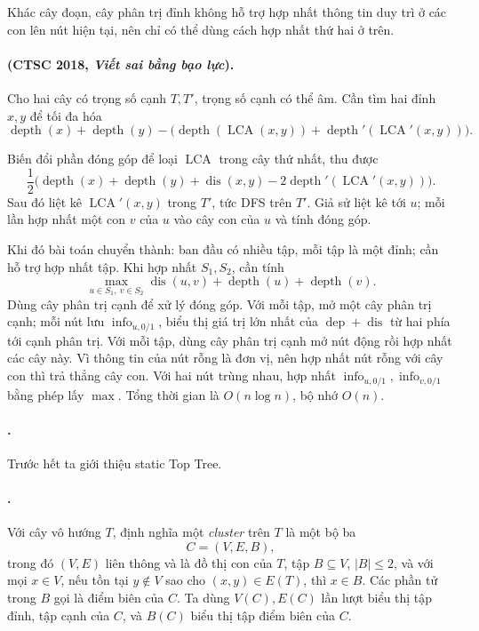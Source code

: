 \documentclass[11pt]{article}
\begin{document}
Khác cây đoạn, cây phân trị đỉnh không hỗ trợ hợp nhất thông tin duy trì ở các
con lên nút hiện tại, nên chỉ có thể dùng cách hợp nhất thứ hai ở trên.

\paragraph{ (CTSC 2018, \emph{Viết sai bằng bạo lực}).}
Cho hai cây có trọng số cạnh \(T,T'\), trọng số cạnh có thể âm. Cần tìm hai
đỉnh \(x,y\) để tối đa hóa
\[
  \operatorname{depth}(x)+\operatorname{depth}(y)
  -\bigl(\operatorname{depth}(\operatorname{LCA}(x,y))
  +\operatorname{depth}'(\operatorname{LCA}'(x,y))\bigr).
\]

Biến đổi phần đóng góp để loại \(\operatorname{LCA}\) trong cây thứ nhất, thu
được
\[
\frac12\bigl(
  \operatorname{depth}(x)+\operatorname{depth}(y)+\operatorname{dis}(x,y)
  -2\operatorname{depth}'(\operatorname{LCA}'(x,y))\bigr).
\]
Sau đó liệt kê \(\operatorname{LCA}'(x,y)\) trong \(T'\), tức DFS trên \(T'\).
Giả sử liệt kê tới \(u\); mỗi lần hợp nhất một con \(v\) của \(u\) vào cây con
của \(u\) và tính đóng góp.

Khi đó bài toán chuyển thành: ban đầu có nhiều tập, mỗi tập là một đỉnh; cần hỗ
trợ hợp nhất tập. Khi hợp nhất \(S_1,S_2\), cần tính
\[
  \max_{u\in S_1,\ v\in S_2}
  \operatorname{dis}(u,v)+\operatorname{depth}(u)+\operatorname{depth}(v).
\]
Dùng cây phân trị cạnh để xử lý đóng góp. Với mỗi tập, mở một cây phân trị cạnh;
mỗi nút lưu \(\operatorname{info}_{u,0/1}\), biểu thị giá trị lớn nhất của
\(\operatorname{dep}+\operatorname{dis}\) từ hai phía tới cạnh phân trị. Với mỗi
tập, dùng cây phân trị cạnh mở nút động rồi hợp nhất các cây này. Vì thông tin
của nút rỗng là đơn vị, nên hợp nhất nút rỗng với cây con thì trả thẳng cây
con. Với hai nút trùng nhau, hợp nhất
\(\operatorname{info}_{u,0/1},\operatorname{info}_{v,0/1}\) bằng phép lấy
\(\max\). Tổng thời gian là \(O(n\log n)\), bộ nhớ \(O(n)\).

\paragraph{.}
Trước hết ta giới thiệu static Top Tree.

\paragraph{.}
Với cây vô hướng \(T\), định nghĩa một \emph{cluster} trên \(T\) là một bộ ba
\[
  C=(V,E,B),
\]
trong đó \((V,E)\) liên thông và là đồ thị con của \(T\), tập
\(B\subseteq V\), \(|B|\le 2\), và với mọi \(x\in V\), nếu tồn tại
\(y\notin V\) sao cho \((x,y)\in E(T)\), thì \(x\in B\). Các phần tử trong
\(B\) gọi là điểm biên của \(C\). Ta dùng \(V(C),E(C)\) lần lượt biểu thị tập
đỉnh, tập cạnh của \(C\), và \(B(C)\) biểu thị tập điểm biên của \(C\).
\end{document}
